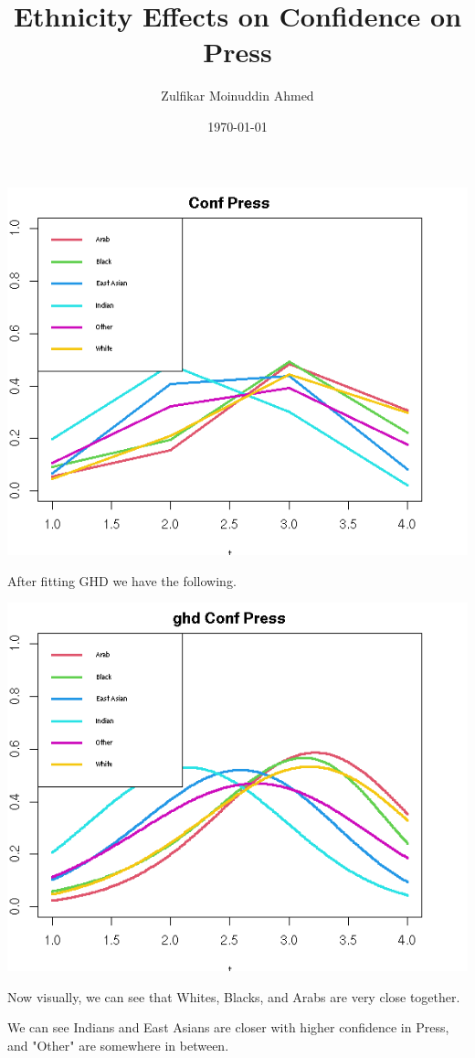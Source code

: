 \documentclass{amsart}
\title{Ethnicity Effects on Confidence on Press}
\author{Zulfikar Moinuddin Ahmed}
\date{\today}
\begin{document}
\maketitle

\includegraphics[scale=0.8]{cfpress_raw.png}

After fitting GHD we have the following.

\includegraphics[scale=0.8]{cfpress_fitted.png}

Now visually, we can see that Whites, Blacks, and Arabs are very close together.

We can see Indians and East Asians are closer with higher confidence in Press, and "Other" are somewhere in between.
\end{document}
